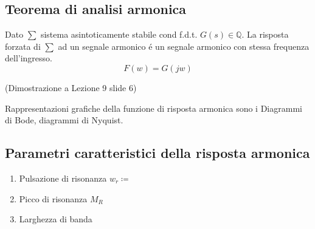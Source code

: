 \documentclass{article}
\begin{document}
\subsection{Teorema di analisi armonica}
Dato $\sum$ sistema asintoticamente stabile cond f.d.t. $G(s) \in \mathbb{Q}$. La risposta forzata di $\sum$ ad un segnale armonico \'e un segnale armonico con stessa frequenza dell'ingresso.
\[ F(w) = G(jw) \]

(Dimostrazione a Lezione 9 slide 6)

Rappresentazioni grafiche della funzione di risposta armonica sono i Diagrammi di Bode, diagrammi di Nyquist.

\subsection{Parametri caratteristici della risposta armonica}
\begin{enumerate}
    \item Pulsazione di risonanza $w_r \coloneqq $
    \item Picco di risonanza $M_R$
    \item Larghezza di banda
\end{enumerate}
\end{document}
